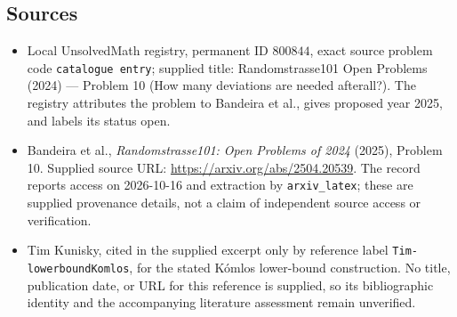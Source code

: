\documentclass[11pt]{article}
\begin{document}
\subsection{Sources}
\begin{itemize}
\item Local UnsolvedMath registry, permanent ID \(800844\), exact source problem code \texttt{catalogue entry}; supplied title: Randomstrasse101 Open Problems (2024) --- Problem 10 (How many deviations are needed afterall?). The registry attributes the problem to Bandeira et al., gives proposed year 2025, and labels its status open.
\item Bandeira et al., \emph{Randomstrasse101: Open Problems of 2024} (2025), Problem 10. Supplied source URL: \url{https://arxiv.org/abs/2504.20539}. The record reports access on 2026-10-16 and extraction by \texttt{arxiv\_latex}; these are supplied provenance details, not a claim of independent source access or verification.
\item Tim Kunisky, cited in the supplied excerpt only by reference label \texttt{Tim-lowerboundKomlos}, for the stated K\'{o}mlos lower-bound construction. No title, publication date, or URL for this reference is supplied, so its bibliographic identity and the accompanying literature assessment remain unverified.
\end{itemize}
\end{document}
